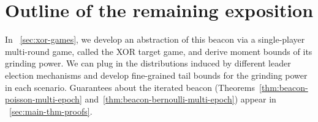 \section{Outline of the remaining exposition}
In \Section~\ref{sec:xor-games}, we develop an abstraction of this beacon 
via a single-player multi-round game, called the XOR target game, 
and derive moment bounds of its grinding power. 
We can plug in the distributions induced by different leader election mechanisms 
and develop fine-grained 
tail bounds for the grinding power 
in each scenario. 
Guarantees about the iterated beacon 
(Theorems~\ref{thm:beacon-poisson-multi-epoch} 
and~\ref{thm:beacon-bernoulli-multi-epoch}) 
appear in \Section~\ref{sec:main-thm-proofs}.




